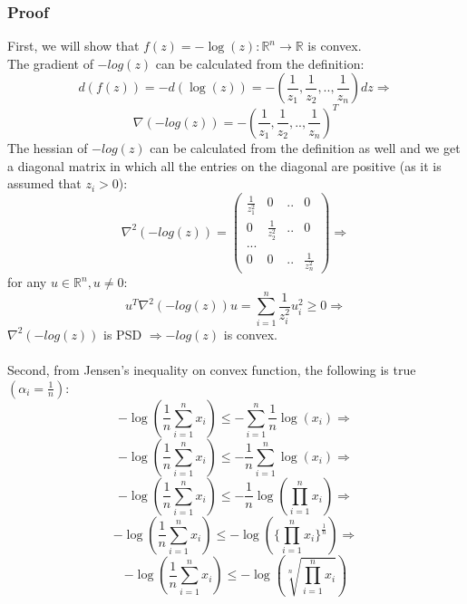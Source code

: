 \documentclass{article}
\begin{document}
\subsubsection*{Proof}
First, we will show that $f(z)=-\log{(z)}:\mathbb{R}^n \rightarrow \mathbb{R}$ is convex.\\
The gradient of $-log(z)$ can be calculated from the definition:\\
$$d(f(z)) = -d(\log{(z)}) = -(\frac{1}{z_1},\frac{1}{z_2},..,\frac{1}{z_n})dz\Rightarrow$$
$$\nabla (-log(z)) = -(\frac{1}{z_1},\frac{1}{z_2},..,\frac{1}{z_n})^T$$
The hessian of $-log(z)$ can be calculated from the definition as well and we get a diagonal matrix in which all the entries on the diagonal are positive (as it is assumed that $z_i > 0$):\\
$$
\nabla^2 (-log(z)) =
\begin{pmatrix}
    \frac{1}{z_1^2} & 0 & .. & 0 \\
    0 & \frac{1}{z_2^2} & .. & 0\\
    ...\\
    0 & 0 &  .. & \frac{1}{z_n^2}
\end{pmatrix}
\Rightarrow$$
for any $u \in \mathbb{R}^n, u \neq 0$:\\
$$u^T \nabla^2 (-log(z)) u = \sum_{i=1}^n \frac{1}{z_i^2} u_i^2 \geq 0 \Rightarrow$$
$\nabla^2 (-log(z))$ is PSD $\Rightarrow -log(z)$ is convex.\\ 
\\
Second, from Jensen's inequality on convex function, the following is true $(\alpha_i = \frac{1}{n})$:\\
$$-\log(\frac{1}{n} \sum_{i=1}^n x_i) \leq -\sum_{i=1}^n \frac{1}{n} \log(x_i) \Rightarrow$$
$$-\log(\frac{1}{n} \sum_{i=1}^n x_i) \leq -\frac{1}{n} \sum_{i=1}^n \log(x_i) \Rightarrow$$
$$-\log(\frac{1}{n} \sum_{i=1}^n x_i) \leq -\frac{1}{n} \log(\prod_{i=1}^n x_i) \Rightarrow$$
$$-\log(\frac{1}{n} \sum_{i=1}^n x_i) \leq -\log(\{\prod_{i=1}^n x_i\}^\frac{1}{n}) \Rightarrow$$
$$-\log(\frac{1}{n} \sum_{i=1}^n x_i) \leq -\log(\sqrt[n]{\prod_{i=1}^n x_i})$$
\end{document}

